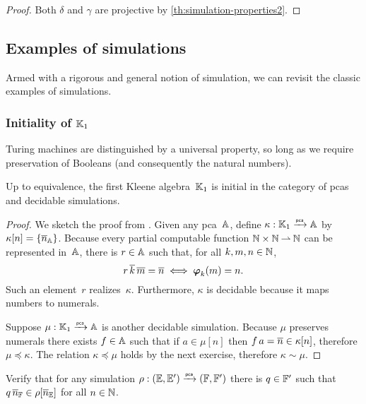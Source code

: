 \begin{proof}
  Both $\delta$ and $\gamma$ are projective by
  \cref{th:simulation-properties2}.
\end{proof}

\subsection{Examples of simulations}
\label{sec:examples-simulations}

Armed with a rigorous and general notion of simulation, we can revisit the classic examples of simulations.

\subsubsection{Initiality of $\klone$}
\label{ex:intiality-K1}%

Turing machines are distinguished by a universal property, so long as we require preservation of Booleans (and consequently the natural numbers).

\begin{theorem}
  Up to equivalence, the first Kleene algebra~$\klone$ is initial in the category of pcas and decidable simulations.
\end{theorem}

\begin{proof}
  We sketch the proof from \cite[Theorem 2.4.18]{Longley:94}. Given any pca~$\AA$, define $\kappa : \klone \pcato \AA$ by $\kappa[n] = \set{\numeral{n}_{\AA}}$. Because every partial computable function $\NN \times \NN \parto \NN$ can be represented in~$\AA$, there is $r \in \AA$ such that, for all $k, m, n \in \NN$,
  \begin{equation*}
    r \, \numeral{k} \, \numeral{m} = \numeral{n} \iff \pr{k}{m} = n.
  \end{equation*}
  Such an element~$r$ realizes~$\kappa$. Furthermore, $\kappa$ is decidable because it maps numbers to numerals.

  Suppose $\mu : \klone \pcato \AA$ is another decidable simulation. Because $\mu$ preserves numerals there exists $f \in \AA$ such that if $a \in \mu[n]$ then $f \, a = \numeral{n} \in \kappa[n]$, therefore $\mu \preceq \kappa$. The relation $\kappa \preceq \mu$ holds by the next exercise, therefore $\kappa \sim \mu$.
\end{proof}

\begin{exercise}
  Verify that for any simulation $\rho : (\EE, \subEE) \pcato (\FF, \subFF)$ there is $q \in \subFF$ such that $q \, \overline{n}_{\FF} \in \rho[\overline{n}_{\EE}]$ for all $n \in \NN$.
\end{exercise}

